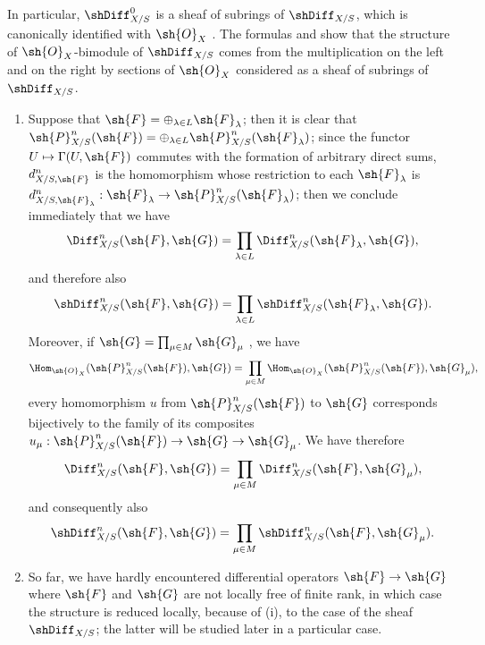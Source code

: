 In particular, $\shDiff_{X/S}^0$ is a sheaf of subrings of $\shDiff_{X/S}$, which is canonically identified with $\sh{O}_X$ .
The formulas  and  show that the structure of $\sh{O}_X$-bimodule of $\shDiff_{X/S}$ comes from the multiplication on the left and on the right by sections of $\sh{O}_X$ considered as a sheaf of subrings of $\shDiff_{X/S}$.

\begin{remarks}[16.8.11]
\label{IV.16.8.11}
\begin{enumerate}
  \item[\rm{(i)}] Suppose that $\sh{F} = \oplus_{\lambda \in L} \sh{F}_\lambda$;
  then it is clear  that $\sh{P}_{X/S}^n(\sh{F}) = \oplus_{\lambda \in L} \sh{P}_{X/S}^n(\sh{F}_\lambda)$;
  since the functor $U \mapsto \Gamma(U, \sh{F})$ commutes with the formation of arbitrary direct sums, $d_{X/S, \sh{F}}^n$ is the homomorphism whose restriction to each $\sh{F}_\lambda$ is $d_{X/S, \sh{F}_\lambda}^n: \sh{F}_\lambda \to \sh{P}_{X/S}^n(\sh{F}_\lambda)$;
  then we conclude immediately that we have 
  \[
    \Diff_{X/S}^n (\sh{F}, \sh{G}) = \prod_{\lambda \in L} \Diff_{X/S}^n (\sh{F}_\lambda, \sh{G}),
  \]
  and therefore also 
  \[
    \shDiff_{X/S}^n (\sh{F}, \sh{G}) = \prod_{\lambda \in L} \shDiff_{X/S}^n (\sh{F}_\lambda, \sh{G}).
  \]
  Moreover, if $\sh{G} = \prod_{\mu \in M} \sh{G}_\mu$ , we have
  \[
    \Hom_{\sh{O}_X}(\sh{P}_{X/S}^n(\sh{F}), \sh{G}) = \prod_{\mu \in M} \Hom_{\sh{O}_X}(\sh{P}_{X/S}^n(\sh{F}), \sh{G}_\mu),
  \]
  every homomorphism $u$ from $\sh{P}_{X/S}^n(\sh{F})$ to $\sh{G}$ corresponds bijectively to the family of its composites $u_\mu: \sh{P}_{X/S}^n(\sh{F}) \to \sh{G} \to \sh{G}_\mu$.
  We have therefore
  \[
    \Diff_{X/S}^n(\sh{F}, \sh{G}) = \prod_{\mu \in M} \Diff_{X/S}^n(\sh{F}, \sh{G}_\mu),
  \]
  and consequently also
  \[
    \shDiff_{X/S}^n(\sh{F}, \sh{G}) = \prod_{\mu \in M} \shDiff_{X/S}^n(\sh{F}, \sh{G}_\mu).
  \]
  \item[\rm{(ii)}]
  So far, we have hardly encountered differential operators $\sh{F} \to \sh{G}$ where $\sh{F}$ and $\sh{G}$ are not locally free of finite rank, in which case the structure is reduced locally, because of \rm{(i)}, to the case of the sheaf $\shDiff_{X/S}$;
  the latter will be studied later  in a particular case.
\end{enumerate}
\end{remarks}

